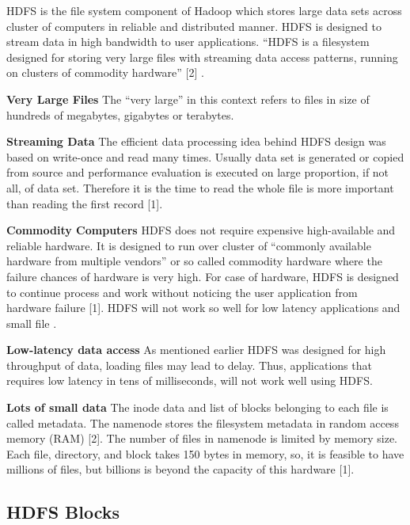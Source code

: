 HDFS is the file system component of Hadoop which stores large data sets across cluster of computers in reliable and distributed manner. HDFS is designed to stream data in high bandwidth to user applications.
“HDFS is a filesystem designed for storing very large files with streaming data access patterns, running on clusters of commodity hardware” [2] .

\textbf{Very Large Files} 
  The “very large” in this context refers to files in size of hundreds of megabytes, gigabytes or terabytes.

\textbf{Streaming Data}
  The efficient data processing idea behind HDFS design was based on write-once and read many times. Usually data set is generated or copied from source and performance evaluation is executed on large proportion, if not all, of data set. Therefore it is the time to read the whole file is more important than reading the first record [1]. 
  
\textbf{Commodity Computers}
   HDFS does not require expensive high-available and reliable hardware. It is designed to run over cluster of  “commonly available hardware from multiple vendors” or so called commodity hardware where the  failure chances of hardware is very high. For case of hardware, HDFS is designed to continue process and work without noticing the user application from hardware failure [1]. 
HDFS will not work so well for low latency applications and small file . 

\textbf{Low-latency data access}
As mentioned earlier HDFS was designed for high throughput of data, loading files may lead to delay. Thus, applications that requires low latency in tens of milliseconds, will not work well using HDFS. 

\textbf{Lots of small data}
The inode data and list of blocks belonging to each file is called metadata. The namenode stores the filesystem metadata in random access memory (RAM) [2]. The number of files in namenode is limited by memory size. Each file, directory, and block takes 150 bytes in memory, so, it is feasible to have millions of files, but billions is beyond the capacity of this hardware [1].
   
\subsection{HDFS Blocks}
 
